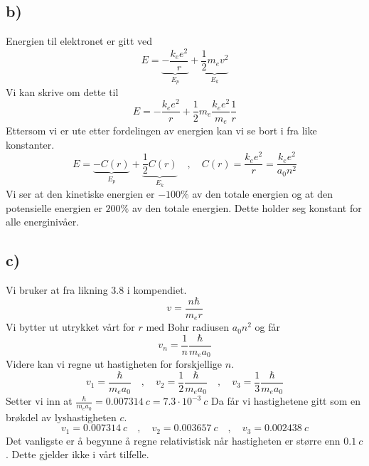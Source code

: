 \documentclass[norsk]{article}
\begin{document}
\subsection*{b)}
Energien til elektronet er gitt ved 
\begin{equation}
E = \underbrace{-\frac{k_ee^2}{r}}_{E_p} + \underbrace{\frac{1}{2} m_e v^2}_{E_k}
\end{equation}
Vi kan skrive om dette til 
\begin{equation}
E = -\frac{k_ee^2}{r} + \frac{1}{2} m_e \frac{k_ee^2}{m_e} \frac{1}{r}
\end{equation}
Ettersom vi er ute etter fordelingen av energien kan vi se bort i fra like konstanter. 
\begin{equation}
E = \underbrace{- C(r)}_{E_p} + \underbrace{\frac{1}{2} C(r)}_{E_k} \quad , \quad C(r) = \frac{k_ee^2}{r} = \frac{k_ee^2}{a_0 n^2}
\end{equation}
Vi ser at den kinetiske energien er $-100 \%$ av den totale energien og at den potensielle energien er $200 \%$ av den totale energien. Dette holder seg konstant for alle energinivåer.

\subsection*{c)}
Vi bruker at  fra likning 3.8 i kompendiet. 
\begin{equation}
v = \frac{nℏ}{m_er}
\end{equation}
Vi bytter ut utrykket vårt for $r$ med Bohr radiusen $a_0 n^2$ og får
\begin{equation}\label{eq: v}
v_n = \frac{1}{n} \frac{ℏ}{m_e a_0}
\end{equation}
Videre kan vi regne ut hastigheten for forskjellige $n$.  
\begin{equation}
v_1 = \frac{ℏ}{m_e a_0} \quad , \quad v_2 = \frac{1}{2}\frac{ℏ}{m_e a_0} \quad , \quad v_3 = \frac{1}{3}\frac{ℏ}{m_e a_0}
\end{equation}
Setter vi inn at $\displaystyle \frac{ℏ}{m_ea_0} = 0.007314 \ c =  7.3 ⋅ 10^{-3} \ c$   
Da får vi hastighetene gitt som en brøkdel av lyshastigheten $c$.
\begin{equation}
v_1 = 0.007314 \ c \quad , \quad v_2 = 0.003657 \ c \quad , \quad v_3 = 0.002438 \ c
\end{equation}
Det vanligste er å begynne å regne relativistisk når hastigheten er større enn $0.1 \ c$. Dette gjelder ikke i vårt tilfelle. 
\end{document}
